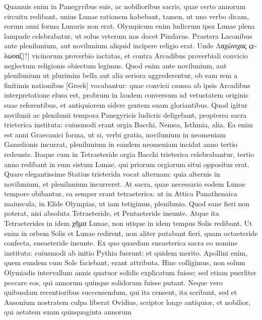 \begin{parnumbers}
Quamuis enim in
Panegyribus suis, ac nobilioribus sacris, quae certo annorum circuitu
redibant, unius Lunae rationem habebant, tamen, ut uno verbo
dicam, eorum anni forma Lunaris non erat.
Olympicum enim ludicrum
ipsa Lunae plena lampade celebrabatur, ut solus veterum nos
docet Pindarus. 
Praetera Laconibus ante plenilunium, aut novilunium
aliquid incipere religio erat.
Unde \textgreek{Λαχώνιχας ςελωοαζ}[?] vicinorum
proverbio iactatas, et contra Arcadibus proverbiali convicio
neglectum religionis obiectum legimus. 
Quod enim ante novilunium,
aut plenilunium ut plurimim bella aut alia seriora aggrederentur,
ob eam rem a finitimis nationibus \textgreek{[Greek]} vocabantur:
quae convicii caussa ab ipsis Arcadibus interpretatione elusa est,
probrum in laudem conversum ad vetustatem originis suae referentibus,
et antiquiorem sidere gentem suam gloriantibus. 
Quod igitur
novilunii ac plenilunii tempora Panegyricis ludicris deligebant,
propterea sacra trieterica instituta: cuiusmodi erant orgia Bacchi,
Nemea, Isthmia, alia.
Ea enim est anni Graecanici forma, ut si, verbi
gratia, novilunium in neomeniam Gamelionis incurrat, plenilunium
in eandem neomeniam incidat anno tertio redeunte.
Itaque
cum in Tetraeteride orgia Bacchi trieterica celebrabantur, tertio
anno redibant in eum sistum Lunae, qui priorum orgiorum situi oppositus
erat.
Quare elegantissime Statius trieterida vocat alternam:
quia alternis in novilunium, et plenilunium incurreret.
At sacra,
quae necessario eodem Lunae tempore obibantur, ea semper erant
tetraeterica: ut in Attica Panathenaica maiuscula, in Elide Olympias,
ut iam tetigimus, plenilunio.
\lnr{}Quod sane fieri non poterat, nisi absoluta
Tetraeteride, et Pentaeteride ineunte.
Atque ita Tetraeterides
in idem \textgreek{χῆμα} Lunae, non utique in idem tempus Solis redibant.
Ut
enim in orbem Solis et Lunae redirent, non aliter putabant fieri,
quam octaeteride confecta, eneaeteride ineunte.
Ex quo quaedam
eneaeterica sacra eo nomine instituta: cuiusmodi ab initio Pythia
fuerunt: et quidem merito.
Apollini enim, quem eundem cum Sole
faciebant, erant attributa.
Hinc colligimus, non solum Olymiadis
intervallum annis quatuor solidis explicatum fuisse; sed etiam puerliter
peccare eos, qui annorum quinque solidorum fuisse putant.
Neque vero quibusdam recentioribus succensendum, qui ita censent,
ita scribunt, sed et Ausonium nostratem culpa liberat Ovidius, scriptor
longe antiquior, et nobilior, qui aetatem suam quinquaginta annorum

\end{parnumbers}
